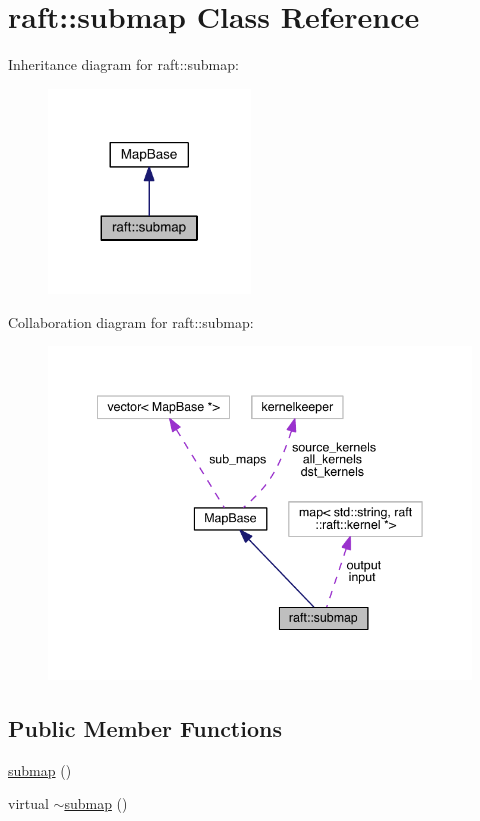 \hypertarget{classraft_1_1submap}{}\section{raft\+:\+:submap Class Reference}
\label{classraft_1_1submap}


Inheritance diagram for raft\+:\+:submap\+:
\nopagebreak
\begin{figure}[H]
\begin{center}
\leavevmode
\includegraphics[width=152pt]{classraft_1_1submap__inherit__graph}
\end{center}
\end{figure}


Collaboration diagram for raft\+:\+:submap\+:
\nopagebreak
\begin{figure}[H]
\begin{center}
\leavevmode
\includegraphics[width=342pt]{classraft_1_1submap__coll__graph}
\end{center}
\end{figure}
\subsection*{Public Member Functions}
\begin{DoxyCompactItemize}
\item 
\hyperlink{classraft_1_1submap_a2140e30c3384ee31b8b210b0a6abf398}{submap} ()
\item 
virtual \hyperlink{classraft_1_1submap_a2a2553b8a5d59a0c7c7146cad9a035c9}{$\sim$submap} ()
\end{DoxyCompactItemize}
